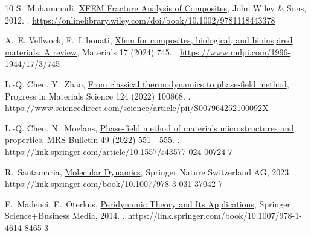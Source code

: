 \documentclass{elsarticle}
\theoremstyle{definition}
\begin{document}
\begin{thebibliography}{10}
S.~Mohammadi,
  \href{https://onlinelibrary.wiley.com/doi/book/10.1002/9781118443378}{XFEM
  Fracture Analysis of Composites}, John Wiley \& Sons, 2012.
\newblock \href {https://doi.org/10.1002/9781118443378}
  {}.
\newline\urlprefix\url{https://onlinelibrary.wiley.com/doi/book/10.1002/9781118443378}

A.~E. Vellwock, F.~Libonati,
  \href{https://www.mdpi.com/1996-1944/17/3/745}{Xfem for composites,
  biological, and bioinspired materials: A review}, Materials 17 (2024) 745.
\newblock \href {https://doi.org/10.3390/ma17030745}
  {}.
\newline\urlprefix\url{https://www.mdpi.com/1996-1944/17/3/745}

L.-Q. Chen, Y.~Zhao,
  \href{https://www.sciencedirect.com/science/article/pii/S007964252100092X}{From
  classical thermodynamics to phase-field method}, Progress in Materials
  Science 124 (2022) 100868.
\newblock \href {https://doi.org/10.1016/j.pmatsci.2021.100868}
  {}.
\newline\urlprefix\url{https://www.sciencedirect.com/science/article/pii/S007964252100092X}

L.-Q. Chen, N.~Moelans,
  \href{https://link.springer.com/article/10.1557/s43577-024-00724-7}{Phase-field
  method of materials microstructures and properties}, MRS Bulletin 49 (2022)
  551–--555.
\newblock \href {https://doi.org/10.1557/s43577-024-00724-7}
  {}.
\newline\urlprefix\url{https://link.springer.com/article/10.1557/s43577-024-00724-7}

R.~Santamaria,
  \href{https://link.springer.com/book/10.1007/978-3-031-37042-7}{Molecular
  Dynamics}, Springer Nature Switzerland AG, 2023.
\newblock \href {https://doi.org/10.1007/978-3-031-37042-7}
  {}.
\newline\urlprefix\url{https://link.springer.com/book/10.1007/978-3-031-37042-7}

E.~Madenci, E.~Oterkus,
  \href{https://link.springer.com/book/10.1007/978-1-4614-8465-3}{Peridynamic
  Theory and Its Applications}, Springer Science+Business Media, 2014.
\newblock \href {https://doi.org/10.1007/978-1-4614-8465-3}
  {}.
\newline\urlprefix\url{https://link.springer.com/book/10.1007/978-1-4614-8465-3}


\end{thebibliography}
\end{document}
